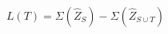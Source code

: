 \begin{equation}
	L(T) = \Sigma(\hat{Z}_{S}) - \Sigma(\hat{Z}_{S \cup T})
	\label{eq:lossfunc}
\end{equation}







